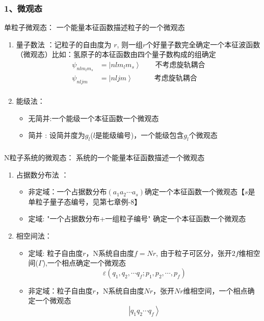 \begin{frame}
  \frametitle{ 1、微观态}
  \alert{单粒子微观态：} 一个能量本征函数描述粒子的一个微观态
  \begin{enumerate}
    \item 量子数法 ：记粒子的自由度为 $r$, 则一组$r$个好量子数完全确定一个本征波函数（微观态）比如：氢原子的本征函数由四个量子数构成的组确定
    \[
      \begin{aligned}
        \psi _{nlm_lm_s} &= \left\vert nlm_lm_s \right\rangle \qquad \text{不考虑旋轨耦合} \\ 
        \psi _{nljm} &= \left\vert nljm \right\rangle \qquad \quad \text{考虑旋轨耦合} \\ 
      \end{aligned}\]
    \item 能级法：
     \begin{itemize}
      \item 无简并:一个能级一个本征函数一个微观态
      \item 简并 : 设简并度为$g_l$($l$是能级编号)，一个能级包含$g_l$个微观态
     \end{itemize}
  \end{enumerate}
\end{frame} 

\begin{frame}
  \frametitle{}
  \alert{N粒子系统的微观态：} 系统的一个能量本征函数描述一个微观态
  \begin{enumerate}
    \item 占据数分布法 ：
    \begin{itemize}
      \item 非定域：一个占据数分布$(a_1 a_2\cdots a_s)$确定一个本征函数一个微观态【$s$是单粒子量子态编号，见第七章例-8】
      \item 定域: "一个占据数分布+一组粒子编号" 确定一个本征函数一个微观态
     \end{itemize}
     \item 相空间法： 
     \begin{itemize}
      \item 定域: 粒子自由度$r$，N系统自由度$f=Nr$, 由于粒子可区分，张开$2f$维相空间($\Gamma$),一个相点确定一个微观态
      \[\varepsilon(q_1,q_2,\cdots q_f; p_1, p_2, \cdots ,p_f)\]
      \item 非定域：粒子自由度$r$，N系统自由度$Nr$，张开$Nr$维相空间，一个相点确定一个微观态
      \[ \left\vert q_1q_2\cdots q_f\right\rangle \]
     \end{itemize}
    \end{enumerate}
\end{frame} 

